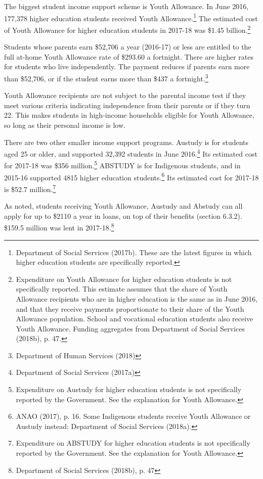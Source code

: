 \documentclass[]{book}
\begin{document}
The biggest student income support scheme is Youth Allowance. In June 2016, 177,378 higher education students received Youth Allowance.\footnote{Department of Social Services (2017b). These are the latest figures in which higher education students are specifically reported.} The estimated cost of Youth Allowance for higher education students in 2017-18 was \$1.45 billion.\footnote{Expenditure on Youth Allowance for higher education students is not specifically reported. This estimate assumes that the share of Youth Allowance recipients who are in higher education is the same as in June 2016, and that they receive payments proportionate to their share of the Youth Allowance population. School and vocational education students also receive Youth Allowance. Funding aggregates from Department of Social Services (2018b), p. 47.}

Students whose parents earn \$52,706 a year (2016-17) or less are entitled to the full at-home Youth Allowance rate of \$293.60 a fortnight. There are higher rates for students who live independently. The payment reduces if parents earn more than \$52,706, or if the student earns more than \$437 a fortnight.\footnote{Department of Human Services (2018)}

Youth Allowance recipients are not subject to the parental income test if they meet various criteria indicating independence from their parents or if they turn 22. This makes students in high-income households eligible for Youth Allowance, so long as their personal income is low.

There are two other smaller income support programs. Austudy is for students aged 25 or older, and supported 32,392 students in June 2016.\footnote{Department of Social Services (2017a)} Its estimated cost for 2017-18 was \$356 million.\footnote{Expenditure on Austudy for higher education students is not specifically reported by the Government. See the explanation for Youth Allowance.} ABSTUDY is for Indigenous students, and in 2015-16 supported 4815 higher education students.\footnote{ANAO (2017), p. 16. Some Indigenous students receive Youth Allowance or Austudy instead: Department of Social Services (2018a).} Its estimated cost for 2017-18 is \$52.7 million.\footnote{Expenditure on ABSTUDY for higher education students is not specifically reported by the Government. See the explanation for Youth Allowance.}

As noted, students receiving Youth Allowance, Austudy and Abstudy can all apply for up to \$2110 a year in loans, on top of their benefits (section 6.3.2). \$159.5 million was lent in 2017-18.\footnote{Department of Social Services (2018b), p. 47}
\end{document}

